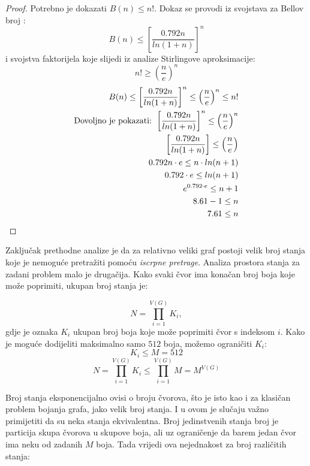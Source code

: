 \documentclass[times, utf8, diplomski, numeric]{fer}
\begin{document}
\begin{proof}
	Potrebno je dokazati $B(n) \le n!$. Dokaz se provodi iz svojstava za Bellov broj \cite{lit20}:
	\[ B(n) \le \left [ \frac{0.792 n}{ln(1+n)} \right ]^n \] 
	i svojstva faktorijela koje slijedi iz analize Stirlingove aproksimacije: \[ n!\ge \left ( \frac{n}{e} \right )^n \]
	\begin{align}
		B(n) \le \left [ \frac{0.792 n}{ln(1+n)} \right ]^n \le \left ( \frac{n}{e} \right )^n \le n! \\
		\textup{Dovoljno je pokazati: } \left [ \frac{0.792 n}{ln(1+n)} \right ]^n \le \left ( \frac{n}{e} \right )^n \\
		\left [ \frac{0.792 n}{ln(1+n)} \right ] \le \left ( \frac{n}{e} \right ) \\
		0.792 n\cdot e \le n \cdot ln(n+1) \\
		0.792\cdot e \le ln(n+1) \\
		e^{0.792\cdot e} \le n+1 \\
		8.61 -1 \le n \\
		7.61 \le n
	\end{align}
\end{proof}

Zaključak prethodne analize je da za relativno veliki graf postoji velik broj stanja koje je nemoguće pretražiti pomoću \emph{iscrpne pretrage}. Analiza prostora stanja za zadani problem malo je drugačija. Kako svaki čvor ima konačan broj boja koje može poprimiti, ukupan broj stanja je:

\begin{equation}
N = \prod_{i=1}^{V(G)} K_i,
\end{equation}
gdje je oznaka $K_i$ ukupan broj boja koje može poprimiti čvor s indeksom $i$. Kako je moguće dodijeliti maksimalno samo $512$ boja, možemo ograničiti $K_i$:
\begin{equation}
K_i \le M = 512
\end{equation}
\begin{equation}
N = \prod_{i=1}^{V(G)} K_i \le \prod_{i=1}^{V(G)} M = M^{V(G)}
\end{equation}

Broj stanja eksponencijalno ovisi o broju čvorova, što je isto kao i za klasičan problem bojanja grafa, jako velik broj stanja. I u ovom je slučaju važno primijetiti da su neka stanja ekvivalentna. Broj jedinstvenih stanja broj je particija skupa čvorova u skupove boja, ali uz ograničenje da barem jedan čvor ima neku od zadanih $M$ boja. Tada vrijedi ova nejednakost za broj različitih stanja:
\end{document}
